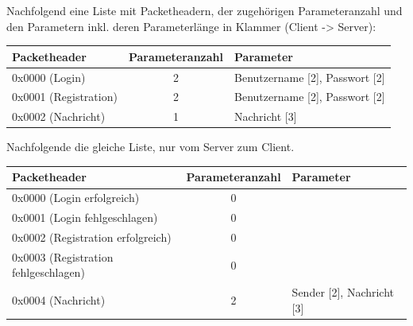 \documentclass[a4paper,12pt]{scrartcl}
\begin{document}
Nachfolgend eine Liste mit Packetheadern, der zugehörigen Parameteranzahl und den Parametern inkl. deren Parameterlänge in Klammer (Client -> Server):
\begin{table}[h]
    \centering
    \begin{tabular}{|l|c|l|}
    \hline
    \textbf{Packetheader}          & \textbf{Parameteranzahl} & \textbf{Parameter}                      \\ \hline
    0x0000 (Login)        & 2               & Benutzername [2], Passwort [2] \\ \hline
    0x0001 (Registration) & 2               & Benutzername [2], Passwort [2] \\ \hline
    0x0002 (Nachricht)    & 1               & Nachricht [3]                  \\ \hline
    \end{tabular}
\end{table}

Nachfolgende die gleiche Liste, nur vom Server zum Client.
\begin{table}[h]
    \centering
    \begin{tabular}{|l|c|l|}
    \hline
    \textbf{Packetheader}          & \textbf{Parameteranzahl} & \textbf{Parameter}                      \\ \hline
    0x0000 (Login erfolgreich)           & 0               & ~                         \\ \hline
    0x0001 (Login fehlgeschlagen)        & 0               & ~                         \\ \hline
    0x0002 (Registration erfolgreich)    & 0               & ~                         \\ \hline
    0x0003 (Registration fehlgeschlagen) & 0               & ~                         \\ \hline
    0x0004 (Nachricht)                   & 2               & Sender [2], Nachricht [3] \\ \hline
    \end{tabular}
\end{table}
\end{document}
